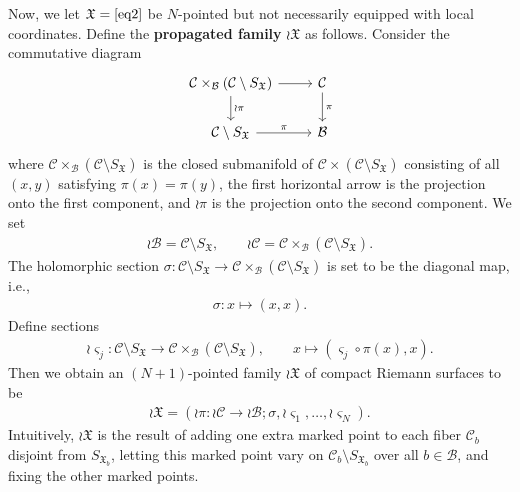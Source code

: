 \documentclass[12pt,a4paper,notitlepage]{article}
\theoremstyle{definition}
\theoremstyle{plain}
\newcommand{\fk}{\mathfrak}
\newcommand{\mc}{\mathcal}
\newcommand{\sgm}{\varsigma}
\newcommand{\SX}{{S_{\fk X}}}
\newcommand{\SXb}{{S_{\fk X_b}}}
\numberwithin{equation}{section}
\begin{document}
Now, we let $\fk X=\eqref{eq2}$ be $N$-pointed but not necessarily equipped with local coordinates. Define the \textbf{propagated family} $\wr\fk X$ as follows. Consider the commutative diagram 
\begin{equation*}
\begin{tikzcd}
\mc C\times_{\mc B}(\mc C\setminus\SX) \arrow[r] \arrow[d, "\wr\pi"] & \mc C \arrow[d, "\pi"] \\
\mc C\setminus\SX\arrow[r, "\pi"] & \mc B
\end{tikzcd}	
\end{equation*}
where $\mc C\times_{\mc B}(\mc C\setminus\SX)$ is the closed submanifold of $\mc C\times(\mc C\setminus\SX)$ consisting of all $(x,y)$ satisfying $\pi(x)=\pi(y)$, the first horizontal arrow is the projection onto the first component, and $\wr\pi$ is the projection onto the second component. \index{X@$\wr\fk X,\wr\mc C,\wr\mc B,\wr\pi$} We set
\begin{align*}
	\wr\mc B=\mc C\setminus\SX,\qquad \wr\mc C=\mc C\times_{\mc B}(\mc C\setminus\SX).	
\end{align*}
The holomorphic section $\sigma:\mc C\setminus\SX\rightarrow\mc C\times_{\mc B}(\mc C\setminus\SX)$ is set to be the diagonal map, i.e.,
\begin{align*}
\sigma:x\mapsto (x,x).	
\end{align*}
Define sections \index{zz@$\wr\sgm_j,\wr^n\sgm_j$}
\begin{align*}
\wr\sgm_j:\mc C\setminus\SX\rightarrow\mc C\times_{\mc B}(\mc C\setminus\SX),\qquad x\mapsto (\sgm_j\circ\pi(x),x).
\end{align*}
Then we obtain an $(N+1)$-pointed family $\wr\fk X$ of compact Riemann surfaces to be
\begin{align}
\wr\fk X=(\wr\pi:\wr\mc C\rightarrow\wr\mc B;\sigma,\wr\sgm_1,\dots,\wr\sgm_N).	\label{eq7}
\end{align}
Intuitively, $\wr\fk X$ is the result of adding one extra marked point to each fiber $\mc C_b$ disjoint from $\SXb$, letting this marked point vary on $\mc C_b\setminus\SXb$ over all $b\in\mc B$, and fixing the other marked points.
\end{document}
